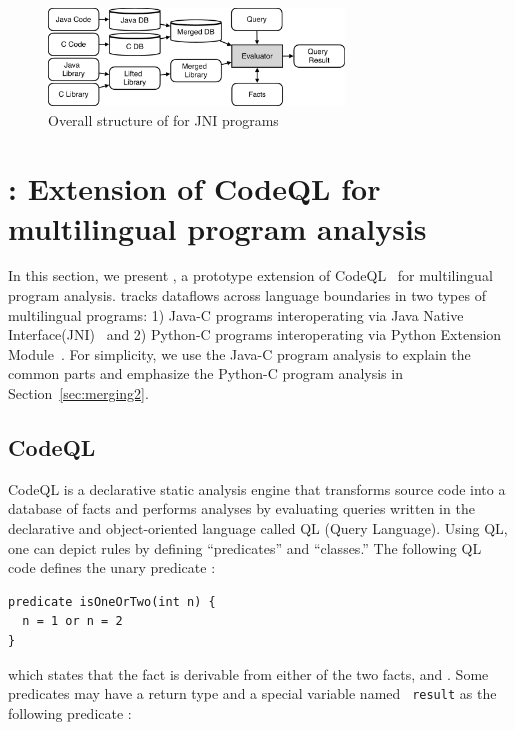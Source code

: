 \begin{figure}[t]
  \centering
  \vspace{2mm}
  \includegraphics[width=0.7\textwidth]{img/codeql.pdf}
  \caption{Overall structure of \ours for JNI programs}
  \label{fig:codeql}
\end{figure}

\section{\ours: Extension of CodeQL for multilingual program analysis}\label{sec:impl}
In this section, we present \ours, a prototype extension of
CodeQL~\cite{codeql} for multilingual program analysis.  \ours tracks dataflows
across language boundaries in two types of multilingual programs: 1) Java-C
programs interoperating via Java Native Interface(JNI)~\cite{jnispec} and 2)
Python-C programs interoperating via Python Extension Module~\cite{pyext}.  For
simplicity, we use the Java-C program analysis to explain the common parts and
emphasize the Python-C program analysis in Section~\ref{sec:merging2}.

\subsection{CodeQL}
CodeQL is a declarative static analysis engine that transforms source code into
a database of facts and performs analyses by evaluating queries written in the
declarative and object-oriented language called QL (Query Language). Using QL,
one can depict rules by defining ``predicates'' and ``classes.'' The following
QL code defines the unary predicate :

\begin{lstlisting}[style=codeql,xleftmargin=2.5em]
predicate isOneOrTwo(int n) {
  n = 1 or n = 2
}
\end{lstlisting}

\noindent
which states that the fact  is derivable from either
of the two facts,  and .
Some predicates may have a return type and a special variable named {\tt
result} as the following predicate :

